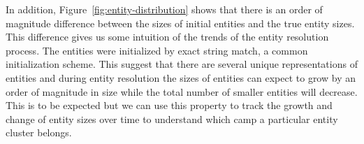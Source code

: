 In addition, Figure~\ref{fig:entity-distribution} shows that there is an
order of magnitude difference between the sizes of initial entities and the
true entity sizes.
This difference gives us some intuition of the trends of the entity resolution process.
The entities were initialized by exact string match, a common initialization scheme.
This suggest that there are several unique representations
of entities and during entity resolution the sizes of entities can expect to grow 
by an order of magnitude in size while the total number of smaller entities will decrease.
This is to be expected but we can use this property to track the growth and
change of entity sizes over time to understand which camp a particular entity
cluster belongs. 



